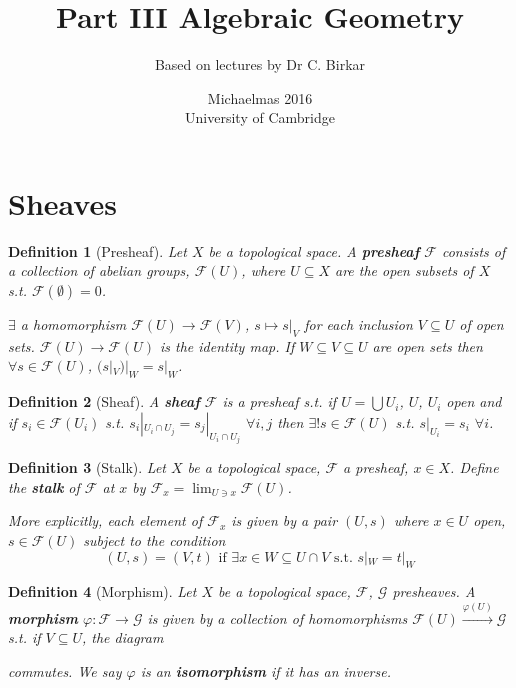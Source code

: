 \documentclass[a4paper]{article}
\title{Part III Algebraic Geometry}
\author{Based on lectures by Dr C. Birkar}
\date{Michaelmas 2016\\University of Cambridge}
\newtheorem*{definition}{Definition}
\begin{document}
\maketitle
\tableofcontents

\section{Sheaves}

\begin{definition}[Presheaf]
	Let $X$ be a topological space. A \textbf{presheaf} $\mathcal{F}$ consists of a collection of abelian groups, $\mathcal{F}(U)$, where $U \subseteq X$ are the open subsets of $X$ s.t. $\mathcal{F}(\emptyset)=0$.
	
	$\exists$ a homomorphism $\mathcal{F}(U)\to\mathcal{F}(V)$, $s \mapsto s|_V$ for each inclusion $V\subseteq U$ of open sets. $\mathcal{F}(U)\to\mathcal{F}(U)$ is the identity map. If $W\subseteq V \subseteq U$ are open sets then $\forall s \in \mathcal{F}(U)$, $(s|_V)|_W=s|_W$.
\end{definition}

\begin{definition}[Sheaf]
	A \textbf{sheaf} $\mathcal{F}$ is a presheaf s.t. if $U=\bigcup U_i$, $U$, $U_i$ open and if $s_i \in \mathcal{F}(U_i)$ s.t. $s_i|_{U_i\cap U_j}=s_j|_{U_i \cap U_j}$ $\forall i,j$ then $\exists ! s\in\mathcal{F}(U)$ s.t. $s|_{U_i}=s_i$ $\forall i$.
\end{definition}

\begin{definition}[Stalk]
	Let $X$ be a topological space, $\mathcal{F}$ a presheaf, $x \in X$. Define the \textbf{stalk} of $\mathcal{F}$ at $x$ by $\mathcal{F}_x = \lim_{U \ni x}\mathcal{F}(U)$.
	
	More explicitly, each element of $\mathcal{F}_x$ is given by a pair $(U, s)$ where $x \in U$ open, $s \in \mathcal{F}(U)$ subject to the condition $$(U,s)=(V,t) \text{ if } \exists x \in W \subseteq U \cap V \text{ s.t. } s|_W=t|_W$$
\end{definition}

\begin{definition}[Morphism]
	Let $X$ be a topological space, $\mathcal{F}$, $\mathcal{G}$ presheaves. A \textbf{morphism} $\varphi: \mathcal{F} \to \mathcal{G}$ is given by a collection of homomorphisms $\mathcal{F}(U)\overset{\varphi(U)}{\to}\mathcal{G}$ s.t. if $V \subseteq U$, the diagram

	
	\noindent commutes. We say $\varphi$ is an \textbf{isomorphism} if it has an inverse.
\end{definition}
\end{document}
